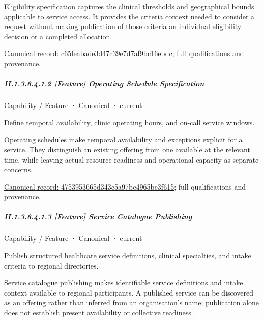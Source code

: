 Eligibility specification captures the clinical thresholds and geographical bounds applicable to service access. It provides the criteria context needed to consider a request without making publication of those criteria an individual eligibility decision or a completed allocation.


{\footnotesize \href{../../../../continuum/strategy/capability/feature/c65feabade3d47c39e7d7af9bc16ebdc.md}{Canonical record: c65feabade3d47c39e7d7af9bc16ebdc}; full qualifications and provenance.}\par
\subparagraph*{II.1.3.6.4.1.2 [Feature] Operating Schedule Specification}
\label{navigation:II.1.3.6.4.1.2}

\label{element:4753953665d343c5a97bc4965be3f615}
{\small Capability / Feature · Canonical · current}\par

Define temporal availability, clinic operating hours, and on-call service windows.



Operating schedules make temporal availability and exceptions explicit for a service. They distinguish an existing offering from one available at the relevant time, while leaving actual resource readiness and operational capacity as separate concerns.


{\footnotesize \href{../../../../continuum/strategy/capability/feature/4753953665d343c5a97bc4965be3f615.md}{Canonical record: 4753953665d343c5a97bc4965be3f615}; full qualifications and provenance.}\par
\subparagraph*{II.1.3.6.4.1.3 [Feature] Service Catalogue Publishing}
\label{navigation:II.1.3.6.4.1.3}

\label{element:d397e670ae524f399e91176c64390fa7}
{\small Capability / Feature · Canonical · current}\par

Publish structured healthcare service definitions, clinical specialties, and intake criteria to regional directories.



Service catalogue publishing makes identifiable service definitions and intake context available to regional participants. A published service can be discovered as an offering rather than inferred from an organisation's name; publication alone does not establish present availability or collective readiness.


